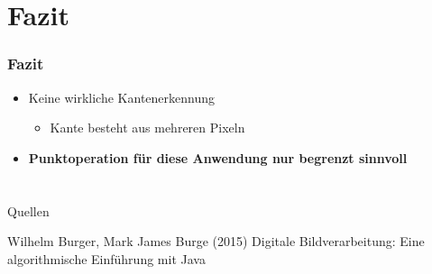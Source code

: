 \documentclass[14pt]{beamer}
\begin{document}
\section{Fazit}

\begin{frame}
	\frametitle{Fazit}
	\begin{itemize}
		\item Keine wirkliche Kantenerkennung 
		\begin{itemize}
			\item Kante besteht aus mehreren Pixeln
		\end{itemize}
		
		\item \textbf{Punktoperation für diese Anwendung nur begrenzt sinnvoll}		
	\end{itemize}
\end{frame}

\section*{}

\begin{frame}
	
	\Large{}	
	\newline
	\begin{block}{Quellen}
		\small{	
		\begin{thebibliography}{99} %
			 Wilhelm Burger, Mark James Burge (2015)
			\newblock Digitale Bildverarbeitung: Eine algorithmische Einführung mit Java
		\end{thebibliography}
		}
	\end{block}
\end{frame}
\end{document}
